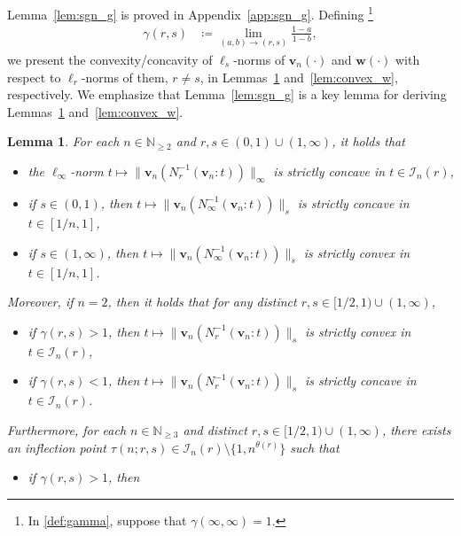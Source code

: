 \documentclass[conference, draftcls, onecolumn]{IEEEtran}
\theoremstyle{plain}
\newtheorem{lemma}{Lemma}
\newcommand{\bvec}[1]{\boldsymbol{#1}}
\newcommand{\lemref}[1]{Lemma~\ref{#1}}
\newcommand{\appref}[1]{Appendix~\ref{#1}}
\begin{document}
\lemref{lem:sgn_g} is proved in \appref{app:sgn_g}.
Defining%
\footnote{In \eqref{def:gamma}, suppose that $\gamma(\infty, \infty) = 1$.}
\begin{align}
\gamma(r, s)
& \coloneqq
\lim_{(a, b) \to (r, s)} \frac{ 1 - a }{ 1 - b } ,
\label{def:gamma}
\end{align}
we present the convexity/concavity of $\ell_{s}$-norms of $\bvec{v}_{n}( \cdot )$ and $\bvec{w}( \cdot )$ with respect to $\ell_{r}$-norms of them, $r \neq s$, in Lemmas~\ref{lem:convex_v} and~\ref{lem:convex_w}, respectively.
We emphasize that \lemref{lem:sgn_g} is a key lemma for deriving Lemmas~\ref{lem:convex_v} and~\ref{lem:convex_w}.




\begin{lemma}
\label{lem:convex_v}
For each $n \in \mathbb{N}_{\ge 2}$ and $r, s \in (0, 1) \cup (1, \infty)$, it holds that
\begin{itemize}
\item
the $\ell_{\infty}$-norm $t \mapsto \| \bvec{v}_{n}( N_{r}^{-1}( \bvec{v}_{n} : t ) ) \|_{\infty}$ is strictly concave in $t \in \mathcal{I}_{n}( r )$,
\item
if $s \in (0, 1)$, then $t \mapsto \| \bvec{v}_{n}( N_{\infty}^{-1}( \bvec{v}_{n} : t ) ) \|_{s}$ is strictly concave in $t \in [1/n, 1]$,
\item
if $s \in (1, \infty)$, then $t \mapsto \| \bvec{v}_{n}( N_{\infty}^{-1}( \bvec{v}_{n} : t ) ) \|_{s}$ is strictly convex in $t \in [1/n, 1]$.
\end{itemize}
Moreover, if $n = 2$, then it holds that for any distinct $r, s \in [1/2, 1) \cup (1, \infty)$,
\begin{itemize}
\item
if $\gamma( r, s ) > 1$, then $t \mapsto \| \bvec{v}_{n}( N_{r}^{-1}( \bvec{v}_{n} : t ) ) \|_{s}$ is strictly convex in $t \in \mathcal{I}_{n}( r )$,
\item
if $\gamma( r, s ) < 1$, then $t \mapsto \| \bvec{v}_{n}( N_{r}^{-1}( \bvec{v}_{n} : t ) ) \|_{s}$ is strictly concave in $t \in \mathcal{I}_{n}( r )$.
\end{itemize}
Furthermore, for each $n \in \mathbb{N}_{\ge 3}$ and distinct $r, s \in [1/2, 1) \cup (1, \infty)$, there exists an inflection point $\tau(n; r, s) \in \mathcal{I}_{n}( r ) \setminus \{ 1, n^{\theta( r )} \}$ such that
\begin{itemize}
\item
if $\gamma(r, s) > 1$, then
\begin{itemize}

\end{itemize}
\end{itemize}
\end{lemma}
\end{document}
